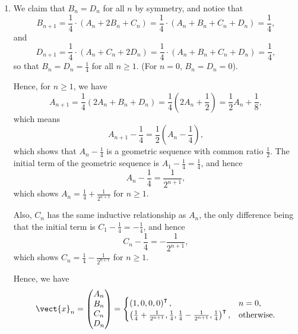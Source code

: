 \begin{enumerate}
    \item We claim that \(B_n = D_n\) for all \(n\) by symmetry, and notice that
          \[
              B_{n + 1} = \frac{1}{4} \cdot (A_n + 2 B_n + C_n) = \frac{1}{4} \cdot (A_n + B_n + C_n + D_n) = \frac{1}{4},
          \]
          and
          \[
              D_{n + 1} = \frac{1}{4} \cdot (A_n + C_n + 2 D_n) = \frac{1}{4} \cdot (A_n + B_n + C_n + D_n) = \frac{1}{4},
          \]
          so that \(B_n = D_n = \frac{1}{4}\) for all \(n \geq 1\). (For \(n = 0\), \(B_n = D_n = 0\)).

          Hence, for \(n \geq 1\), we have
          \[
              A_{n + 1} = \frac{1}{4} (2 A_n + B_n + D_n) = \frac{1}{4} \left(2 A_n + \frac{1}{2}\right) = \frac{1}{2} A_n + \frac{1}{8},
          \]
          which means
          \[
              A_{n + 1} - \frac{1}{4} = \frac{1}{2} \left(A_n - \frac{1}{4}\right),
          \]
          which shows that \(A_n - \frac{1}{4}\) is a geometric sequence with common ratio \(\frac{1}{2}\). The initial term of the geometric sequence is \(A_1 - \frac{1}{4} = \frac{1}{4}\), and hence
          \[
              A_n - \frac{1}{4} = \frac{1}{2^{n + 1}},
          \]
          which shows \(A_n = \frac{1}{4} + \frac{1}{2^{n + 1}}\) for \(n \geq 1\).

          Also, \(C_n\) has the same inductive relationship as \(A_n\), the only difference being that the initial term is \(C_1 - \frac{1}{4} = -\frac{1}{4}\), and hence
          \[
              C_n - \frac{1}{4} = -\frac{1}{2^{n + 1}},
          \]
          which shows \(C_n = \frac{1}{4} - \frac{1}{2^{n + 1}}\) for \(n \geq 1\).

          Hence, we have
          \[
              \vect{x}_n = \begin{pmatrix}
                  A_n \\
                  B_n \\
                  C_n \\
                  D_n
              \end{pmatrix} = \begin{cases}
                  \left(
                  1, 0, 0, 0
                  \right)^\intercal, & n = 0,            \\
                  \left(
                  \frac{1}{4} + \frac{1}{2^{n + 1}}, \frac{1}{4}, \frac{1}{4} - \frac{1}{2^{n + 1}}, \frac{1}{4}
                  \right)^\intercal, & \text{otherwise}.
              \end{cases}
          \]
\end{enumerate}